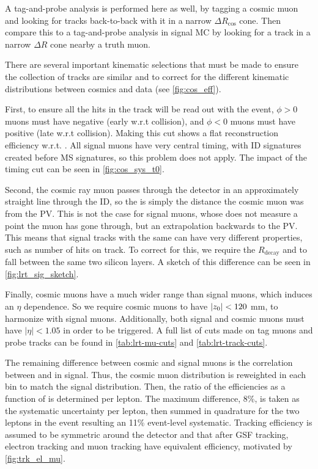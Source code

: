 A tag-and-probe analysis is performed here as well, by tagging a cosmic muon and looking for tracks back-to-back with it in a narrow $\Delta R_{\text{cos}}$ cone. Then compare this to a tag-and-probe analysis in signal \ac{MC} by looking for a track in a narrow $\Delta R$ cone nearby a truth muon. 

There are several important kinematic selections that must be made to ensure the collection of tracks are similar and to correct for the different kinematic distributions between cosmics and data (see \autoref{fig:cos_eff}). 

First, to ensure all the hits in the track will be read out with the event, $\phi > 0$ muons must have negative \tavg (early w.r.t collision), and $\phi < 0$ muons must have positive \tavg (late w.r.t collision). Making this cut shows a flat reconstruction efficiency w.r.t. \tavg. All signal muons have very central timing, with \ac{ID} signatures created before \ac{MS} signatures, so this problem does not apply. The impact of the timing cut can be seen in \autoref{fig:cos_sys_t0}. 

Second, the cosmic ray muon passes through the detector in an approximately straight line through the \ac{ID}, so the \dz is simply the distance the cosmic muon was from the PV. This is not the case for signal muons, whose \dz does not measure a point the muon has gone through, but an extrapolation backwards to the PV. This means that signal tracks with the same \dz can have very different properties, such as number of hits on track. To correct for this, we require the $R_{\textrm{decay}}$ and \dz to fall between the same two silicon layers. A sketch of this difference can be seen in \autoref{fig:lrt_sig_sketch}. 

Finally, cosmic muons have a much wider \z range than signal muons, which induces an $\eta$ dependence. So we require cosmic muons to have $|z_0| < 120$ mm, to harmonize with signal muons. Additionally, both signal and cosmic muons must have $|\eta| < 1.05$ in order to be triggered. A full list of cuts made on tag muons and probe tracks can be found in \autoref{tab:lrt-mu-cuts} and \autoref{tab:lrt-track-cuts}.

The remaining difference between cosmic and signal muons is the correlation between \pt and \absdz in signal. Thus, the cosmic muon \pt distribution is reweighted in each \absdz bin to match the signal distribution. Then, the ratio of the efficiencies as a function of \absdz is determined per lepton. The maximum difference, 8\%, is taken as the systematic uncertainty per lepton, then summed in quadrature for the two leptons in the event resulting an 11\% event-level systematic. Tracking efficiency is assumed to be symmetric around the detector and that after GSF tracking, electron tracking and muon tracking have equivalent efficiency, motivated by \autoref{fig:trk_el_mu}. 



